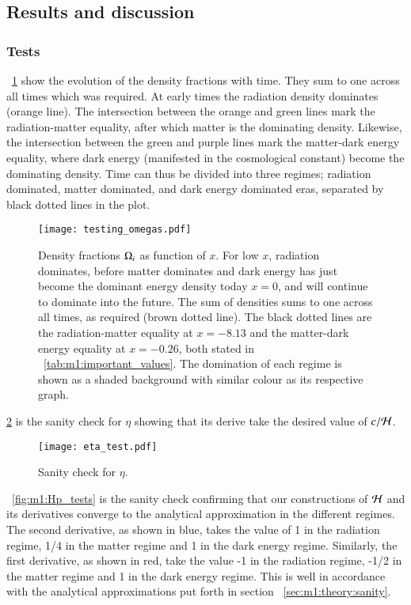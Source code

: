\subsection{Results and discussion}\label{sec:m1:results}

\subsubsection{Tests}\label{sec:m1:results:tests}
    ~\cref{fig:m1:omega_tests} show the evolution of the density fractions with time. They sum to one across all times which was required. At early times the radiation density dominates (orange line). The intersection between the orange and green lines mark the radiation-matter equality, after which matter is the dominating density. Likewise, the intersection between the green and purple lines mark the matter-dark energy equality, where dark energy (manifested in the cosmological constant) become the dominating density. Time can thus be divided into three regimes; radiation dominated, matter dominated, and dark energy dominated eras, separated by black dotted lines in the plot. 
    \begin{figure}
        \texttt{[image: testing\_omegas.pdf]}
        \caption{Density fractions $\Omega_i$ as function of $x$. For low $x$, radiation dominates, before matter dominates and dark energy has just become the dominant energy density today $x=0$, and will continue to dominate into the future. The sum of densities sums to one across all times, as required (brown dotted line). The black dotted lines are the radiation-matter equality at $x=-8.13$ and the matter-dark energy equality at $x=-0.26$, both stated in ~\cref{tab:m1:important_values}. The domination of each regime is shown as a shaded background with similar colour as its respective graph. }
        \label{fig:m1:omega_tests}
    \end{figure}
    \cref{fig:m1:eta_tests} is the sanity check for $\eta$ showing that its derive take the desired value of $c/\mathcal{H}$.

    \begin{figure}
        \texttt{[image: eta\_test.pdf]}
        \caption{Sanity check for $\eta$.}
        \label{fig:m1:eta_tests}
    \end{figure}

    ~\cref{fig:m1:Hp_tests} is the sanity check confirming that our constructions of $\mathcal{H}$ and its derivatives converge to the analytical approximation in the different regimes. The second derivative, as shown in blue, takes the value of 1 in the radiation regime, 1/4 in the matter regime and 1 in the dark energy regime. Similarly, the first derivative, as shown in red, take the value -1 in the radiation regime, -1/2 in the matter regime and 1 in the dark energy regime. This is well in accordance with the analytical approximations put forth in section ~\cref{sec:m1:theory:sanity}. 

